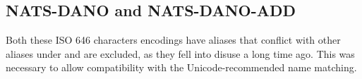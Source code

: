 \documentclass{wg21}
\begin{document}
%
%
%
%
%

\subsection{NATS-DANO and NATS-DANO-ADD}

Both these ISO 646 characters encodings have aliases that conflict with other aliases under  and are excluded, as they fell into disuse a long time ago.
This was necessary to allow compatibility with the Unicode-recommended name matching.
\end{document}
